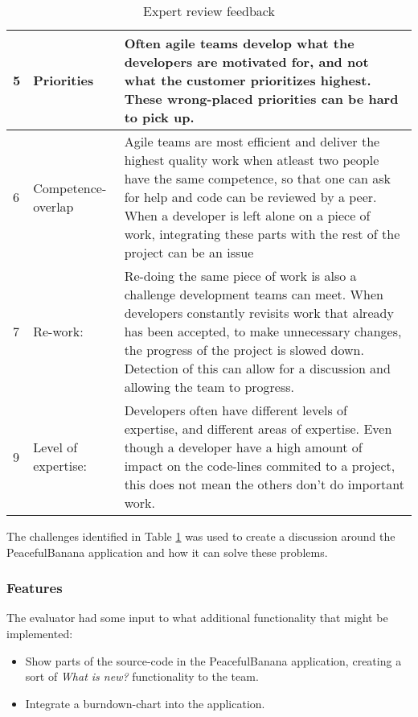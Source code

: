 \begin{table}[H]
\begin{tabularx}{\textwidth}{|l|l|X|}
    5  & Priorities          & Often agile teams develop what the developers are motivated for, and not what the customer prioritizes highest. These wrong-placed priorities can be hard to pick up.                                                                                                                                                                                          \\ \hline
    6  & Competence-overlap  & Agile teams are most efficient and deliver the highest quality work when atleast two people have the same competence, so that one can ask for help and code can be reviewed by a peer. When a developer is left alone on a piece of work, integrating these parts with the rest of the project can be an issue                                                 \\ \hline
    7  & Re-work:            & Re-doing the same piece of work is also a challenge development teams can meet. When developers constantly revisits work that already has been accepted, to make unnecessary changes, the progress of the project is slowed down. Detection of this can allow for a discussion and allowing the team to progress.                                              \\ \hline
    9  & Level of expertise: & Developers often have different levels of expertise, and different areas of expertise. Even though a developer have a high amount of impact on the code-lines commited to a project, this does not mean the others don't do important work.                                                                                                                    \\ \hline
    \end{tabularx}
    \caption {Expert review feedback}
    \label{experttable}
\end{table}
\clearpage
The challenges identified in Table \ref{experttable} was used to create a discussion around the PeacefulBanana application and how it can solve these problems. 

\subsubsection{Features}
The evaluator had some input to what additional functionality that might be implemented: 
\begin{itemize}
	\item Show parts of the source-code in the PeacefulBanana application, creating a sort of \emph{What is new?} functionality to the team. 
	\item Integrate a burndown-chart into the application. 
\end{itemize}


